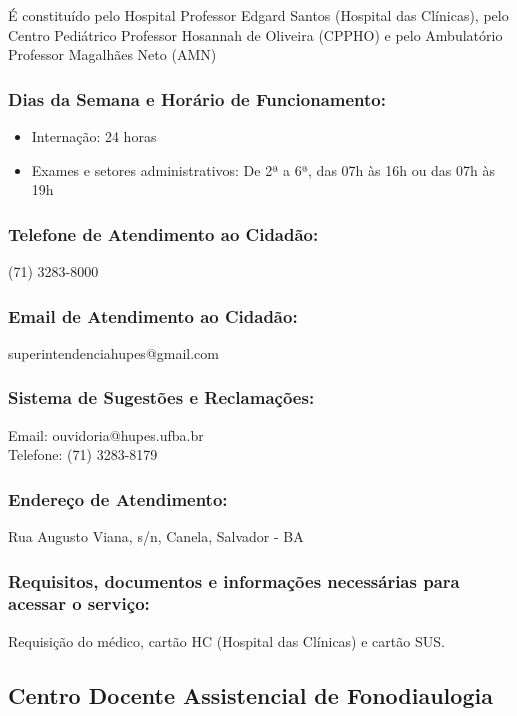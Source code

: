     É constituído pelo Hospital Professor Edgard Santos (Hospital das Clínicas), pelo Centro Pediátrico Professor Hosannah de Oliveira (CPPHO) e pelo Ambulatório Professor Magalhães Neto (AMN)
    
    \subsubsection{Dias da Semana e Horário de Funcionamento:}
            \begin{itemize}
                \item Internação: 24 horas
                
                \item Exames e setores administrativos:
                De 2ª a 6ª, das 07h às 16h ou das 07h às 19h
            \end{itemize}
    
    \subsubsection {Telefone de Atendimento ao Cidadão:}
            (71) 3283-8000

    \subsubsection{Email de Atendimento ao Cidadão:}
            superintendenciahupes@gmail.com
    
    \subsubsection{Sistema de Sugestões e Reclamações:}
            Email: ouvidoria@hupes.ufba.br \\ Telefone: (71) 3283-8179

    \subsubsection{Endereço de Atendimento:}
            Rua Augusto Viana, s/n, Canela, Salvador - BA

    \subsubsection{Requisitos, documentos e informações necessárias para acessar o serviço:}
            Requisição do médico, cartão HC (Hospital das Clínicas) e cartão SUS.
    
    \subsection{Centro Docente Assistencial de Fonodiaulogia}
    
